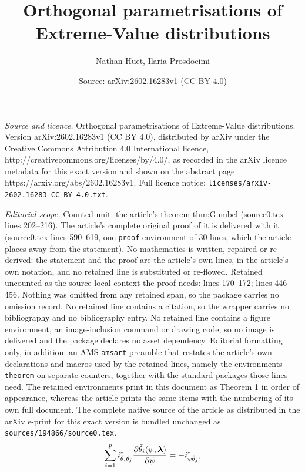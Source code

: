 \documentclass[10pt,a4paper]{amsart}
\title{Orthogonal parametrisations of Extreme-Value distributions}
\author{Nathan Huet, Ilaria Prosdocimi}
\date{Source: arXiv:2602.16283v1 (CC BY 4.0)}
\begin{document}
\maketitle

\noindent\emph{Source and licence.} Orthogonal parametrisations of Extreme-Value distributions. Version arXiv:2602.16283v1 (CC BY 4.0), distributed by arXiv under the Creative Commons Attribution 4.0 International licence, http://creativecommons.org/licenses/by/4.0/, as recorded in the arXiv licence metadata for this exact version and shown on the abstract page https://arxiv.org/abs/2602.16283v1. Full licence notice: \texttt{licenses/arxiv-2602.16283-CC-BY-4.0.txt}.\par\smallskip

\noindent\textit{Editorial scope.} Counted unit: the article's theorem thm:Gumbel (source0.tex lines 202--216). The article's complete original proof of it is delivered with it (source0.tex lines 590--619, one \texttt{proof} environment of 30 lines, which the article places away from the statement). No mathematics is written, repaired or re-derived: the statement and the proof are the article's own lines, in the article's own notation, and no retained line is substituted or re-flowed.  Retained uncounted as the source-local context the proof needs: lines 170--172; lines 446--456.  Nothing was omitted from any retained span, so the package carries no omission record.  No retained line contains a citation, so the wrapper carries no bibliography and no bibliography entry.  No retained line contains a figure environment, an image-inclusion command or drawing code, so no image is delivered and the package declares no asset dependency.  Editorial formatting only, in addition: an AMS \texttt{amsart} preamble that restates the article's own declarations and macros used by the retained lines, namely the environments \texttt{theorem} on separate counters, together with the standard packages those lines need.  The retained environments print in this document as Theorem 1 in order of appearance, whereas the article prints the same items with the numbering of its own full document.  The complete native source of the article as distributed in the arXiv e-print for this exact version is bundled unchanged as \texttt{sources/194866/source0.tex}.
\begin{equation}\label{eq:orthogonal_pde}
    \sum_{i=1}^p i^*_{\Tilde{\theta}_i\Tilde{\theta}_j} \frac{\partial\Tilde{\theta}_i(\psi, \bm{\lambda})}{\partial\psi} = - i^*_{\psi\Tilde{\theta}_j},
\end{equation}
\end{document}
